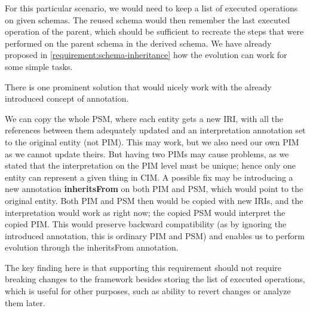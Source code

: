 For this particular scenario, we would need to keep a list of executed operations on given schemas. The reused schema would then remember the last executed operation of the parent, which should be sufficient to recreate the steps that were performed on the parent schema in the derived schema. We have already proposed in \autoref{requirement:schema-inheritance} how the evolution can work for some simple tasks.

There is one prominent solution that would nicely work with the already introduced concept of annotation.

We can copy the whole PSM, where each entity gets a new IRI, with all the references between them adequately updated and an interpretation annotation set to the original entity (not PIM). This may work, but we also need our own PIM as we cannot update theirs. But having two PIMs may cause problems, as we stated that the interpretation on the PIM level must be unique; hence only one entity can represent a given thing in CIM. A possible fix may be introducing a new annotation \textbf{inheritsFrom} on both PIM and PSM, which would point to the original entity. Both PIM and PSM then would be copied with new IRIs, and the interpretation would work as right now; the copied PSM would interpret the copied PIM. This would preserve backward compatibility (as by ignoring the introduced annotation, this is ordinary PIM and PSM) and enables us to perform evolution through the inheritsFrom annotation.

The key finding here is that supporting this requirement should not require breaking changes to the framework besides storing the list of executed operations, which is useful for other purposes, such as ability to revert changes or analyze them later.

